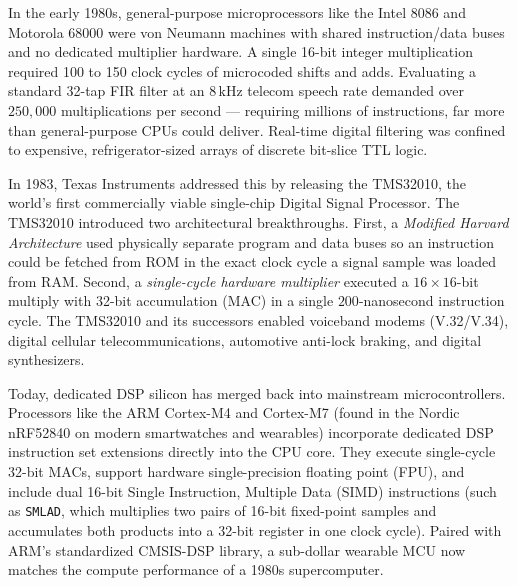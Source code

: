 \begin{historybox}
In the early 1980s, general-purpose microprocessors like the Intel 8086 and Motorola 68000 were von Neumann machines with shared instruction/data buses and no dedicated multiplier hardware. A single 16-bit integer multiplication required 100 to 150 clock cycles of microcoded shifts and adds. Evaluating a standard 32-tap FIR filter at an $8\,\text{kHz}$ telecom speech rate demanded over $250{,}000$ multiplications per second --- requiring millions of instructions, far more than general-purpose CPUs could deliver. Real-time digital filtering was confined to expensive, refrigerator-sized arrays of discrete bit-slice TTL logic.

In 1983, Texas Instruments addressed this by releasing the TMS32010, the world's first commercially viable single-chip Digital Signal Processor. The TMS32010 introduced two architectural breakthroughs. First, a \emph{Modified Harvard Architecture} used physically separate program and data buses so an instruction could be fetched from ROM in the exact clock cycle a signal sample was loaded from RAM. Second, a \emph{single-cycle hardware multiplier} executed a $16\times 16$-bit multiply with 32-bit accumulation (MAC) in a single $200$-nanosecond instruction cycle.
The TMS32010 and its successors enabled voiceband modems (V.32/V.34), digital cellular telecommunications, automotive anti-lock braking, and digital synthesizers. 

Today, dedicated DSP silicon has merged back into mainstream microcontrollers. Processors like the ARM Cortex-M4 and Cortex-M7 (found in the Nordic nRF52840 on modern smartwatches and wearables) incorporate dedicated DSP instruction set extensions directly into the CPU core. They execute single-cycle 32-bit MACs, support hardware single-precision floating point (FPU), and include dual 16-bit Single Instruction, Multiple Data (SIMD) instructions (such as \texttt{SMLAD}, which multiplies two pairs of 16-bit fixed-point samples and accumulates both products into a 32-bit register in one clock cycle). Paired with ARM's standardized CMSIS-DSP library, a sub-dollar wearable MCU now matches the compute performance of a 1980s supercomputer.
\end{historybox}

